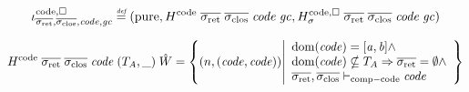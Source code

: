 \documentclass[a4paper]{article}
\begin{document}
\[
  \codereg{\sigrets,\sigcloss,\code,\gc} \defeq (\pure,
H^\mathrm{code} \; \sigrets \; \sigcloss \; \code \; \gc,
H^\mathrm{code,\square}_\sigma \; \sigrets \; \sigcloss \; \code \; \gc)
\]

\begin{equation*}
  H^\mathrm{code} \; \sigrets \; \sigcloss \; \code \; (\ta,\_) \; \hat{W} = \left\{\npair{(\code,\code)} \middle|
    \begin{array}{l}
    \dom(\code) = [\aaddr,\baddr] \wedge \\
    \dom(\code) \nsubseteq \ta \Rightarrow \sigrets = \emptyset \wedge \\
    \sigrets,\sigcloss \vdash_{\mathrm{comp-code}} \code 
    \end{array}
  \right\}
\end{equation*}
\end{document}
